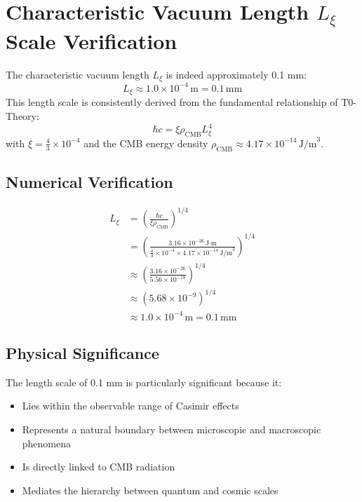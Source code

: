 \documentclass[12pt,a4paper]{article}
\numberwithin{equation}{section}
\begin{document}
	\section*{Characteristic Vacuum Length $L_\xi$ Scale Verification}
	
	\begin{important}
		The characteristic vacuum length $L_\xi$ is indeed approximately 0.1 mm:
		\[
		L_\xi \approx 1.0 \times 10^{-4}\,\text{m} = 0.1\,\text{mm}
		\]
		This length scale is consistently derived from the fundamental relationship of T0-Theory:
		\[
		\hbar c = \xi \rho_{\text{CMB}} L_\xi^4
		\]
		with $\xi = \frac{4}{3} \times 10^{-4}$ and the CMB energy density $\rho_{\text{CMB}} \approx 4.17 \times 10^{-14}\,\text{J/m}^3$.
	\end{important}
	
	\subsection*{Numerical Verification}
	
	\begin{align*}
		L_\xi &= \left(\frac{\hbar c}{\xi \rho_{\text{CMB}}}\right)^{1/4} \\
		&= \left(\frac{3.16 \times 10^{-26}\,\text{J·m}}{\frac{4}{3} \times 10^{-4} \times 4.17 \times 10^{-14}\,\text{J/m}^3}\right)^{1/4} \\
		&\approx \left(\frac{3.16 \times 10^{-26}}{5.56 \times 10^{-18}}\right)^{1/4} \\
		&\approx \left(5.68 \times 10^{-9}\right)^{1/4} \\
		&\approx 1.0 \times 10^{-4}\,\text{m} = 0.1\,\text{mm}
	\end{align*}
	
	\subsection*{Physical Significance}
	
	The length scale of 0.1 mm is particularly significant because it:
	\begin{itemize}
		\item Lies within the observable range of Casimir effects
		\item Represents a natural boundary between microscopic and macroscopic phenomena
		\item Is directly linked to CMB radiation
		\item Mediates the hierarchy between quantum and cosmic scales
	\end{itemize}
\end{document}

